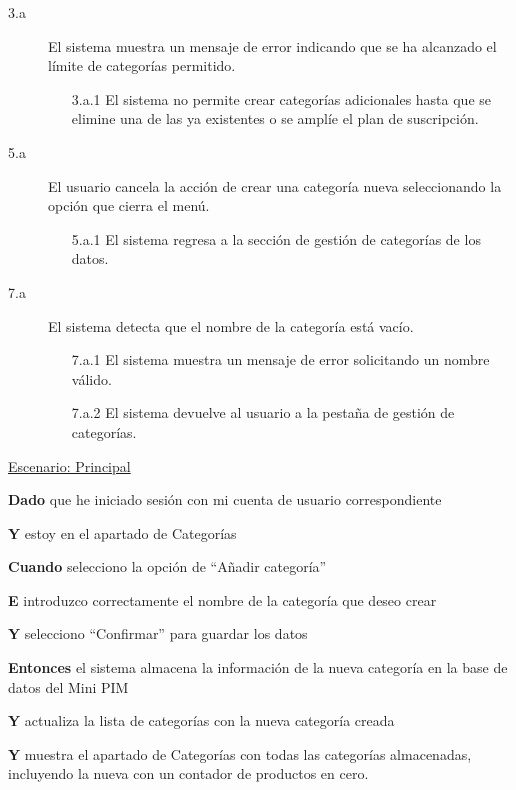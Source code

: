 \begin{description}

    \item[3.a] El sistema muestra un mensaje de error indicando que se ha alcanzado el límite de categorías permitido.
    \begin{enumerate}
        \item[3.a.1] El sistema no permite crear categorías adicionales hasta que se elimine una de las ya existentes o se amplíe el plan de suscripción.
    \end{enumerate}

    \item[5.a] El usuario cancela la acción de crear una categoría nueva seleccionando la opción que cierra el menú.
    \begin{enumerate}
        \item[5.a.1] El sistema regresa a la sección de gestión de categorías de los datos.
    \end{enumerate}

    \item[7.a] El sistema detecta que el nombre de la categoría está vacío.
    \begin{enumerate}
        \item[7.a.1] El sistema muestra un mensaje de error solicitando un nombre válido.
        \item[7.a.2] El sistema devuelve al usuario a la pestaña de gestión de categorías.
    \end{enumerate}
\end{description}

\underline{Escenario: Principal}\par
\vspace{0.15cm}
\textbf{Dado} que he iniciado sesión con mi cuenta de usuario correspondiente\par
\textbf{Y} estoy en el apartado de Categorías\par
\textbf{Cuando} selecciono la opción de “Añadir categoría”\par
\textbf{E} introduzco correctamente el nombre de la categoría que deseo crear\par
\textbf{Y} selecciono “Confirmar” para guardar los datos\par
\textbf{Entonces} el sistema almacena la información de la nueva categoría en la base de datos del Mini PIM\par
\textbf{Y} actualiza la lista de categorías con la nueva categoría creada\par
\textbf{Y} muestra el apartado de Categorías con todas las categorías almacenadas, incluyendo la nueva con un contador de productos en cero.\par

